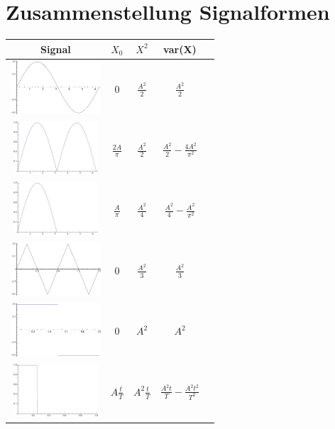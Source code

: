 \section{Zusammenstellung Signalformen}
\begin{table}[htdp]
\begin{center}
\begin{tabular}{|c|c|c|c|c|}

\hline
\textbf{Signal} & \textbf{$   X_0   $} & \textbf{$X^2$} & \textbf{var(X)} \\
\hline
\includegraphics[height=2cm]{./bilder/Sinus.pdf} & $0$ & $\frac{A^2}{2}$ &
$\frac{A^2}{2}$ \\
\hline
\includegraphics[height=2cm]{./bilder/absSinus.pdf}  & $\frac{2A}{\pi}$ &
$\frac{A^2}{2}$ & $\frac{A^2}{2}-\frac{4A^2}{\pi^2}$\\
\hline
\includegraphics[height=2cm]{./bilder/halbSinus.pdf} & $\frac{A}{\pi}$ &
$\frac{A^2}{4}$ & $\frac{A^2}{4}-\frac{A^2}{\pi^2}$\\
\hline
\includegraphics[height=2cm]{./bilder/triangular.pdf} & $0$ & $\frac{A^2}{3}$ &
$\frac{A^2}{3}$ \\
\hline
\includegraphics[height=2cm]{./bilder/square.pdf} & $0$ & $A^2$ & $A^2$ \\
\hline
\includegraphics[height=2cm]{./bilder/pwm.pdf}  & $A\frac{t}{T}$ &
$A^2\frac{t}{T}$ & $\frac{A^2t}{T}-\frac{A^2t^2}{T^2}$ \\
\hline

\end{tabular}
\end{center}
\label{default}
\end{table}